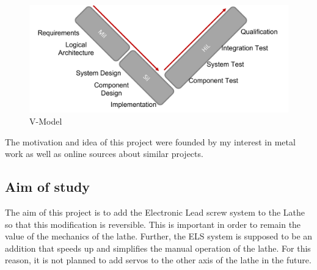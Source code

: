 \begin{figure}
    \begin{center}
    \includegraphics[width=12cm]{Pictures/VModelComplete.png}
    \caption[V-Model Complete]{V-Model}
    \label{V-Model Complete}
    \end{center}
\end{figure}
 
The motivation and idea of this project were founded by my interest in metal work as well as online sources about similar projects.\cite{CloughELS}
 
\subsection{Aim of study}
The aim of this project is to add the Electronic Lead screw system to the Lathe so that this modification is reversible. This is important in order to remain the value of the mechanics of the lathe. Further, the ELS system is supposed to be an addition that speeds up and simplifies the manual operation of the lathe. For this reason, it is not planned to add servos to the other axis of the lathe in the future.
 
 





